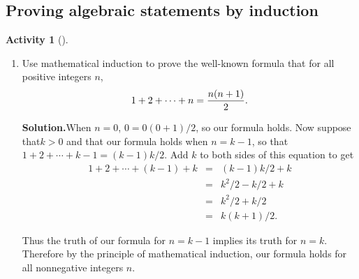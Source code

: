 \documentclass[10pt,]{book}
\theoremstyle{plain}
\theoremstyle{definition}
\newtheorem{activity}[project]{Activity}
\numberwithin{equation}{chapter}
\newcommand{\amp}{&}
\begin{document}
\subsection[{Proving algebraic statements by induction}]{Proving algebraic statements by induction}\label{subsection-13}
\begin{activity}[]\label{activity-74}
~\par
\begin{enumerate}[label=(\alph*)]
 \item Use mathematical induction to prove the well-known formula that for all positive integers \(n\),%
\begin{equation*}
1+2 + \cdots +n = {n(n+1)\over 2}.
\end{equation*}
%
\par\medskip\noindent%
\textbf{Solution.}\quad When \(n=0\), \(0=0(0+1)/2\), so our formula holds. Now suppose that\(k>0\) and that our formula holds when \(n=k-1\), so that \(1+2+\cdots+k-1=(k-1)k/2\). Add \(k\) to both sides of this equation to get%
\begin{align*}
1+2+\cdots+(k-1)+k\amp =\amp  (k-1)k/2 +k\\
\amp =\amp  k^2/2-k/2+k\\
\amp =\amp
k^2/2+k/2\\
\amp =\amp k(k+1)/2.
\end{align*}
%
\par
Thus the truth of our formula for \(n=k-1\) implies its truth for \(n=k\). Therefore by the principle of mathematical induction, our formula holds for all nonnegative integers \(n\).%


\end{enumerate}
\end{activity}
\end{document}
